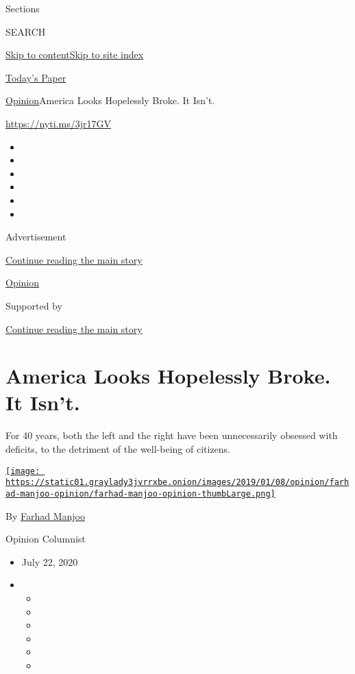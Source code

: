 Sections

SEARCH

\protect\hyperlink{site-content}{Skip to
content}\protect\hyperlink{site-index}{Skip to site index}

\href{https://myaccount.nytimes3xbfgragh.onion/auth/login?response_type=cookie\&client_id=vi}{}

\href{https://www.nytimes3xbfgragh.onion/section/todayspaper}{Today's
Paper}

\href{/section/opinion}{Opinion}\textbar{}America Looks Hopelessly
Broke. It Isn't.

\url{https://nyti.ms/3jr17GV}

\begin{itemize}
\item
\item
\item
\item
\item
\item
\end{itemize}

Advertisement

\protect\hyperlink{after-top}{Continue reading the main story}

\href{/section/opinion}{Opinion}

Supported by

\protect\hyperlink{after-sponsor}{Continue reading the main story}

\hypertarget{america-looks-hopelessly-broke-it-isnt}{%
\section{America Looks Hopelessly Broke. It
Isn't.}\label{america-looks-hopelessly-broke-it-isnt}}

For 40 years, both the left and the right have been unnecessarily
obsessed with deficits, to the detriment of the well-being of citizens.

\href{https://www.nytimes3xbfgragh.onion/by/farhad-manjoo}{\texttt{[image: https://static01.graylady3jvrrxbe.onion/images/2019/01/08/opinion/farhad-manjoo-opinion/farhad-manjoo-opinion-thumbLarge.png]}}

By \href{https://www.nytimes3xbfgragh.onion/by/farhad-manjoo}{Farhad
Manjoo}

Opinion Columnist

\begin{itemize}
\item
  July 22, 2020
\item
  \begin{itemize}
  \item
  \item
  \item
  \item
  \item
  \item
  \end{itemize}
\end{itemize}

